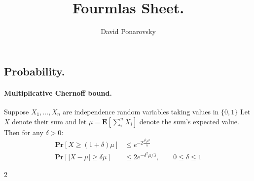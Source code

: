 \documentclass{article}
\newcommand{\prb}[1]{ \mathbf{Pr} \left[ {#1} \right]}
\newcommand{\expp}[1]{ \mathbf{E} \left[ {#1} \right]}
\begin{document}
\title{Fourmlas Sheet.} 
\author{David Ponarovsky}
\maketitle
\begin{multicols*}{2}
\subsection*{ Probability. } 
\paragraph{Multiplicative Chernoff bound.} Suppose $ X_1, ..., X_n$ are independence random variables taking values in $\{0, 1\}$ Let $X$ denote their sum and let $\mu = \expp{\sum_{i}^{n}{X_{i}}} $  denote the sum's expected value. Then for any $\delta > 0$: 
\begin{equation*}
    \begin{split}
      \prb{ X \ge \left( 1+\delta \right) \mu } & \le e^{-2\frac{\delta^2\mu^{2}}{n}} \\ 
      \prb{ |X - \mu| \ge \delta\mu } & \le 2e^{-\delta^2\mu/3}, \qquad 0 \le \delta \le 1
    \end{split}
  \end{equation*}
\end{multicols*}{2}
\end{document}
